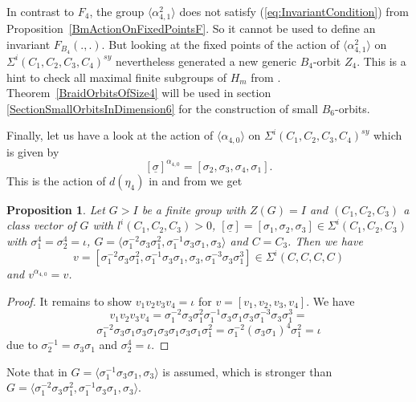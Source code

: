 \documentclass[12pt,a4paper]{article}
\newtheorem{proposition}{Proposition}[section]
\numberwithin{equation}{section}
\numberwithin{table}{section}
\begin{document}
%
\par
\noindent
In contrast to $F_4$, the group $\langle \alpha_{4,1}^2 \rangle$ does not satisfy (\ref{eq:InvariantCondition}) from Proposition~\ref{BmActionOnFixedPointsF}.
So it cannot be used to define an invariant $F_{B_4}(.,.)$. But looking at the fixed points of the action of 
$\langle \alpha_{4,1}^2 \rangle$ on $\Sigma^i(C_1,C_2,C_3,C_4)^{sy}$ nevertheless generated a new generic $B_4$-orbit $Z_4$.
This is a hint to check all maximal finite subgroups of $H_m$ from \cite[Theorem 3]{RefGon2008}.
Theorem~\ref{BraidOrbitsOfSize4} will be used in section \ref{SectionSmallOrbitsInDimension6} for the construction of small $B_6$-orbits.
\par
\noindent
Finally, let us have a look at the action of $\langle \alpha_{4,0} \rangle$ on $\Sigma^i(C_1,C_2,C_3,C_4)^{sy}$ which is given by
$$[\underline{\sigma}]^{\alpha_{4,0}} = [\sigma_2, \sigma_3, \sigma_4, \sigma_1].$$
This is the action of $d(\eta_4)$ in \cite[III, § 1, Satz 3(4)]{RefMat1987} and from
\cite[III, § 2, Satz 5(d)]{RefMat1987} we get
%
\begin{proposition}
\label{FixedPointsOfAlpha40}
Let $G>I$ be a finite group with $Z(G)=I$ and $(C_1,C_2,C_3)$ a class vector of $G$ with $l^i(C_1,C_2,C_3)>0$,
$[\underline{\sigma}] = [\sigma_1,\sigma_2,\sigma_3] \in \Sigma^i(C_1,C_2,C_3)$ with $\sigma_1^4 = \sigma_2^4 = \iota$,
$G = \langle \sigma_1^{-2} \sigma_3 \sigma_1^2, \sigma_1^{-1} \sigma_3 \sigma_1, \sigma_3 \rangle$ and $C = C_3$. Then we have
$$v = [\sigma_1^{-2} \sigma_3 \sigma_1^2, \sigma_1^{-1} \sigma_3 \sigma_1, \sigma_3, \sigma_1^{-3} \sigma_3 \sigma_1^3] \in \Sigma^i(C,C,C,C)$$
and
$v^{\alpha_{4,0}} = v$.
\end{proposition}
\begin{proof}
It remains to show $v_1 v_2 v_3 v_4 = \iota$ for $v = [v_1, v_2, v_3, v_4]$. We have
$$v_1 v_2 v_3 v_4 = \sigma_1^{-2} \sigma_3 \sigma_1^2 \sigma_1^{-1} \sigma_3 \sigma_1 
\sigma_3 \sigma_1^{-3} \sigma_3 \sigma_1^3 =$$
$$\sigma_1^{-2} \sigma_3 \sigma_1 \sigma_3 \sigma_1 \sigma_3 \sigma_1 \sigma_3 \sigma_1 \sigma_1^2 =
\sigma_1^{-2} (\sigma_3 \sigma_1)^4 \sigma_1^2 = \iota$$
due to $\sigma_2^{-1} = \sigma_3 \sigma_1$ and $\sigma_2^4 = \iota$.
\end{proof}
%
\noindent
Note that in \cite[III, § 2, Satz 5(d)]{RefMat1987} $G = \langle \sigma_1^{-1} \sigma_3 \sigma_1, \sigma_3 \rangle$
is assumed, which is stronger than $G = \langle \sigma_1^{-2} \sigma_3 \sigma_1^2, \sigma_1^{-1} \sigma_3 \sigma_1,
\sigma_3 \rangle$.
\par
\end{document}
